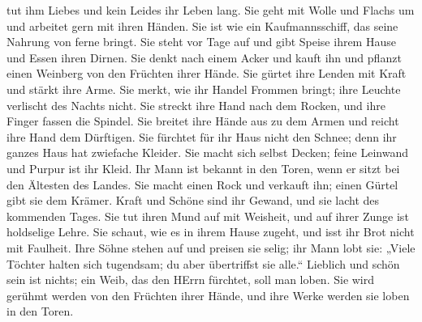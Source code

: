 tut ihm Liebes und kein Leides ihr Leben lang.  Sie geht
mit Wolle und Flachs um und arbeitet gern mit ihren Händen.
 Sie ist wie ein Kaufmannsschiff, das seine Nahrung von
ferne bringt.  Sie steht vor Tage auf und gibt Speise ihrem
Hause und Essen ihren Dirnen.  Sie denkt nach einem Acker
und kauft ihn und pflanzt einen Weinberg von den Früchten ihrer Hände.
 Sie gürtet ihre Lenden mit Kraft und stärkt ihre Arme.
 Sie merkt, wie ihr Handel Frommen bringt; ihre Leuchte
verlischt des Nachts nicht.  Sie streckt ihre Hand nach dem
Rocken, und ihre Finger fassen die Spindel.  Sie breitet
ihre Hände aus zu dem Armen und reicht ihre Hand dem Dürftigen.
 Sie fürchtet für ihr Haus nicht den Schnee; denn ihr
ganzes Haus hat zwiefache Kleider.  Sie macht sich selbst
Decken; feine Leinwand und Purpur ist ihr Kleid.  Ihr Mann
ist bekannt in den Toren, wenn er sitzt bei den Ältesten des Landes.
 Sie macht einen Rock und verkauft ihn; einen Gürtel gibt
sie dem Krämer.  Kraft und Schöne sind ihr Gewand, und sie
lacht des kommenden Tages.  Sie tut ihren Mund auf mit
Weisheit, und auf ihrer Zunge ist holdselige Lehre.  Sie
schaut, wie es in ihrem Hause zugeht, und isst ihr Brot nicht mit
Faulheit.  Ihre Söhne stehen auf und preisen sie selig; ihr
Mann lobt sie:  „Viele Töchter halten sich tugendsam; du
aber übertriffst sie alle.``  Lieblich und schön sein ist
nichts; ein Weib, das den HErrn fürchtet, soll man loben. 
Sie wird gerühmt werden von den Früchten ihrer Hände, und ihre Werke
werden sie loben in den Toren.
